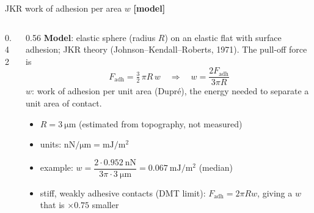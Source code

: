 \documentclass[aspectratio=169,9pt]{beamer}
\newcommand{\tagMo}{\textcolor{cRed}{\textbf{[model]}}}
\begin{document}
\begin{frame}{JKR work of adhesion per area $w$ \tagMo}
\begin{columns}[T]
\begin{column}{0.42\textwidth}
\centering
{}
\end{column}
\begin{column}{0.56\textwidth}\small
\textbf{Model}: elastic sphere (radius $R$) on an elastic flat with surface adhesion; JKR theory (Johnson--Kendall--Roberts, 1971). The pull-off force is
\[F_\text{adh}=\tfrac32\,\pi R\,w\quad\Longrightarrow\quad w=\frac{2F_\text{adh}}{3\pi R}\]
$w$: work of adhesion per unit area (Dupré), the energy needed to separate a unit area of contact.
\begin{itemize}
\item $R=\SI{3}{\micro\metre}$ (estimated from topography, not measured)
\item units: $\si{\nano\newton\per\micro\metre}=\si{\milli\joule\per\square\metre}$
\item example: $w=\dfrac{2\cdot\SI{0.952}{\nano\newton}}{3\pi\cdot\SI{3}{\micro\metre}}=\SI{0.067}{\milli\joule\per\square\metre}$ (median)
\item stiff, weakly adhesive contacts (DMT limit): $F_\text{adh}=2\pi Rw$, giving a $w$ that is $\times0.75$ smaller
\end{itemize}
\end{column}
\end{columns}
\end{frame}
\end{document}

